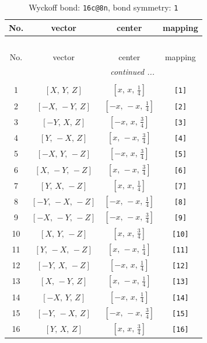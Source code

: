 \documentclass[fleqn,8pt]{jsarticle}
\begin{document}
\begin{longtable}{cccc}
\caption{Wyckoff bond: {\tt 16c@8n}, bond symmetry: {\tt 1}}
 \\
 \hline \hline
No. & vector & center & mapping \\ \hline \endfirsthead

\multicolumn{3}{l}{\tablename\ \thetable{}} \\
 \hline \hline
No. & vector & center & mapping \\ \hline \endhead

 \hline \hline
\multicolumn{3}{r}{\footnotesize\it continued ...} \\ \endfoot

 \hline \hline
\multicolumn{3}{r}{} \\ \endlastfoot

1 & $\left[ X,\, Y,\, Z \right]$ & $\left[ x,\, x,\, \frac{1}{4} \right]$ & {\tt [1]} \\ \hline
2 & $\left[ - X,\, - Y,\, Z \right]$ & $\left[ - x,\, - x,\, \frac{1}{4} \right]$ & {\tt [2]} \\ \hline
3 & $\left[ - Y,\, X,\, Z \right]$ & $\left[ - x,\, x,\, \frac{3}{4} \right]$ & {\tt [3]} \\ \hline
4 & $\left[ Y,\, - X,\, Z \right]$ & $\left[ x,\, - x,\, \frac{3}{4} \right]$ & {\tt [4]} \\ \hline
5 & $\left[ - X,\, Y,\, - Z \right]$ & $\left[ - x,\, x,\, \frac{3}{4} \right]$ & {\tt [5]} \\ \hline
6 & $\left[ X,\, - Y,\, - Z \right]$ & $\left[ x,\, - x,\, \frac{3}{4} \right]$ & {\tt [6]} \\ \hline
7 & $\left[ Y,\, X,\, - Z \right]$ & $\left[ x,\, x,\, \frac{1}{4} \right]$ & {\tt [7]} \\ \hline
8 & $\left[ - Y,\, - X,\, - Z \right]$ & $\left[ - x,\, - x,\, \frac{1}{4} \right]$ & {\tt [8]} \\ \hline
9 & $\left[ - X,\, - Y,\, - Z \right]$ & $\left[ - x,\, - x,\, \frac{3}{4} \right]$ & {\tt [9]} \\ \hline
10 & $\left[ X,\, Y,\, - Z \right]$ & $\left[ x,\, x,\, \frac{3}{4} \right]$ & {\tt [10]} \\ \hline
11 & $\left[ Y,\, - X,\, - Z \right]$ & $\left[ x,\, - x,\, \frac{1}{4} \right]$ & {\tt [11]} \\ \hline
12 & $\left[ - Y,\, X,\, - Z \right]$ & $\left[ - x,\, x,\, \frac{1}{4} \right]$ & {\tt [12]} \\ \hline
13 & $\left[ X,\, - Y,\, Z \right]$ & $\left[ x,\, - x,\, \frac{1}{4} \right]$ & {\tt [13]} \\ \hline
14 & $\left[ - X,\, Y,\, Z \right]$ & $\left[ - x,\, x,\, \frac{1}{4} \right]$ & {\tt [14]} \\ \hline
15 & $\left[ - Y,\, - X,\, Z \right]$ & $\left[ - x,\, - x,\, \frac{3}{4} \right]$ & {\tt [15]} \\ \hline
16 & $\left[ Y,\, X,\, Z \right]$ & $\left[ x,\, x,\, \frac{3}{4} \right]$ & {\tt [16]} \\
\end{longtable}
\end{document}
